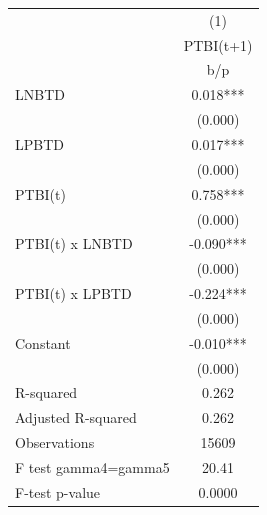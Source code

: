 {
\def\sym#1{\ifmmode^{#1}\else\(^{#1}\)\fi}
\begin{tabular}{l*{1}{c}}
\hline\hline
                    &\multicolumn{1}{c}{(1)}\\
                    &\multicolumn{1}{c}{PTBI(t+1)}\\
                    &         b/p   \\
\hline
LNBTD               &       0.018***\\
                    &     (0.000)   \\
LPBTD               &       0.017***\\
                    &     (0.000)   \\
PTBI(t)             &       0.758***\\
                    &     (0.000)   \\
PTBI(t) x LNBTD     &      -0.090***\\
                    &     (0.000)   \\
PTBI(t) x LPBTD     &      -0.224***\\
                    &     (0.000)   \\
Constant            &      -0.010***\\
                    &     (0.000)   \\
\hline
R-squared           &       0.262   \\
Adjusted R-squared  &       0.262   \\
Observations        &       15609   \\
F test gamma4=gamma5&       20.41   \\
F-test p-value      &      0.0000   \\
\hline\hline
\end{tabular}
}
